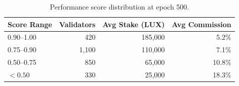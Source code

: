 \begin{table}[H]
\centering
\caption{Performance score distribution at epoch 500.}
\label{tab:scores}
\begin{tabular}{lrrr}
\toprule
\textbf{Score Range} & \textbf{Validators} & \textbf{Avg Stake (LUX)} & \textbf{Avg Commission} \\
\midrule
0.90--1.00 & 420 & 185,000 & 5.2\% \\
0.75--0.90 & 1,100 & 110,000 & 7.1\% \\
0.50--0.75 & 850 & 65,000 & 10.8\% \\
$< 0.50$ & 330 & 25,000 & 18.3\% \\
\bottomrule
\end{tabular}
\end{table}


